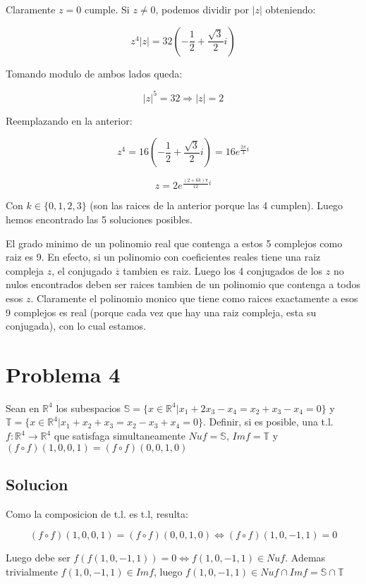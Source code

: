 \documentclass{article}
\begin{document}
Claramente $z=0$ cumple. Si $z\neq0$, podemos dividir por $|z|$ obteniendo:

$$z^4|z| = 32(-\frac{1}{2} + \frac{\sqrt{3}}{2} i)$$

Tomando modulo de ambos lados queda:

$$|z|^5 = 32 \Rightarrow |z| = 2$$

Reemplazando en la anterior:

$$z^4 = 16(-\frac{1}{2} + \frac{\sqrt{3}}{2} i) = 16e^{\frac{2 \pi}{3} i}$$

$$z = 2e^{\frac{(2 + 6k) \pi}{12} i}$$

Con $k \in \{ 0,1,2,3 \}$ (son las raices de la anterior porque las 4 cumplen). Luego hemos encontrado las 5 soluciones posibles.

El grado minimo de un polinomio real que contenga a estos 5 complejos como raiz es 9. En efecto, si un polinomio con coeficientes reales
tiene una raiz compleja $z$, el conjugado $\overline z$ tambien es raiz. Luego los 4 conjugados de los $z$ no nulos encontrados deben
ser raices tambien de un polinomio que contenga a todos esos $z$. Claramente el polinomio monico que tiene como raices exactamente
a esos 9 complejos es real (porque cada vez que hay una raiz compleja, esta su conjugada), con lo cual estamos.

\section{Problema 4}

Sean en $\mathbb{R}^4$ los subespacios $\mathbb{S} = \{ x \in \mathbb{R}^4 | x_1 + 2x_3 - x_4 = x_2 + x_3 - x_4 = 0 \}$
y $\mathbb{T} = \{ x \in \mathbb{R}^4 | x_1 + x_2 + x_3 = x_2 - x_3 + x_4 = 0 \}$. Definir, si es posible, una
t.l. $f : \mathbb{R}^4 \rightarrow \mathbb{R}^4$ que satisfaga simultaneamente $Nu f = \mathbb{S}$, $Im f = \mathbb{T}$ y
$(f \circ f)(1,0,0,1) = (f \circ f)(0,0,1,0) $

\subsection{Solucion}

Como la composicion de t.l. es t.l, resulta:

$$(f \circ f)(1,0,0,1) = (f \circ f)(0,0,1,0) \Leftrightarrow (f \circ f)(1,0,-1,1) = 0 $$

Luego debe ser $f(f(1,0,-1,1)) = 0 \Leftrightarrow f(1,0,-1,1) \in Nu f$. Ademas trivialmente $f(1,0,-1,1) \in Im f$, luego
$f(1,0,-1,1) \in Nu f \cap Im f = \mathbb{S} \cap \mathbb{T}$
\end{document}

